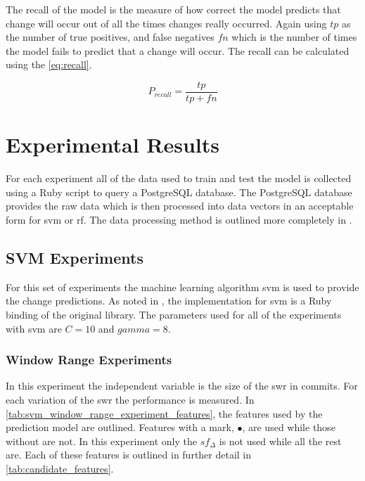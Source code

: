 The recall of the model is the measure of how correct the model predicts that change will occur out of all the times changes really occurred. Again using $tp$ as the number of true positives, and false negatives $fn$ which is the number of times the model fails to predict that a change will occur. The recall can be calculated using the \autoref{eq:recall}.

\begin{equation} 
\label{eq:recall}
P_{recall} = \frac{tp}{tp+fn}
\end{equation}

\section{Experimental Results}
\label{sec:experimental_results}


For each experiment all of the data used to train and test the model is collected using a Ruby script to query a PostgreSQL database. The PostgreSQL database provides the raw data which is then processed into data vectors in an acceptable form for \gls{svm} or \gls{rf}. The data processing method is outlined more completely in .

\subsection{SVM Experiments}
\label{subsec:svm_experiments}

For this set of experiments the machine learning algorithm \gls{svm} is used to provide the change predictions. As noted in , the implementation for \gls{svm} is a Ruby binding of the original library. The parameters used for all of the experiments with \gls{svm} are $C = 10$ and $gamma = 8$.


\subsubsection{Window Range Experiments}
\label{sec:svm_swr_experiment}


In this experiment the independent variable is the size of the \gls{swr} in commits. For each variation of the \gls{swr} the performance is measured. In \autoref{tab:svm_window_range_experiment_features}, the features used by the prediction model are outlined. Features with a mark, $\bullet$, are used while those without are not. In this experiment only the $sf_{\Delta}$ is not used while all the rest are. Each of these features is outlined in further detail in \autoref{tab:candidate_features}.

